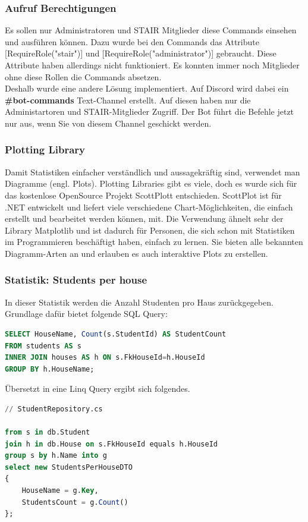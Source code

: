 \documentclass[a4paper, table]{article}
\begin{document}
\subsubsection*{Aufruf Berechtigungen}
Es sollen nur Administratoren und STAIR Mitglieder diese Commands einsehen und ausführen können.
Dazu wurde bei den Commands das Attribute [RequireRole("stair")] und [RequireRole("administrator")] gebraucht.
Diese Attribute haben allerdings nicht funktioniert.
Es konnten immer noch Mitglieder ohne diese Rollen die Commands absetzen.\\
Deshalb wurde eine andere Lösung implementiert.
Auf Discord wird dabei ein \textbf{\#bot-commands} Text-Channel erstellt.
Auf diesen haben nur die Administartoren und STAIR-Mitglieder Zugriff.
Der Bot führt die Befehle jetzt nur aus, wenn Sie von diesem Channel geschickt werden.

\subsubsection*{Plotting Library}
Damit Statistiken einfacher verständlich und aussagekräftig sind, verwendet man Diagramme (engl. Plots).
Plotting Libraries gibt es viele, doch es wurde sich für das kostenlose OpenSource Projekt ScottPlott entschieden.
ScottPlot ist für .NET entwickelt und liefert viele verschiedene Chart-Möglichkeiten, die einfach erstellt und bearbeitet werden können, mit.
Die Verwendung ähnelt sehr der Library Matplotlib und ist dadurch für Personen, die sich schon mit Statistiken im Programmieren beschäftigt haben, einfach zu lernen.
Sie bieten alle bekannten Diagramm-Arten an und erlauben es auch interaktive Plots zu erstellen. \autocite{noauthor_scottplot_nodate}

\newpage
\subsubsection*{Statistik: Students per house}
In dieser Statistik werden die Anzahl Studenten pro Haus zurückgegeben.
Grundlage dafür bietet folgende SQL Query:

\begin{lstlisting}[language=SQL]
SELECT HouseName, Count(s.StudentId) AS StudentCount
FROM students AS s
INNER JOIN houses AS h ON s.FkHouseId=h.HouseId
GROUP BY h.HouseName;
\end{lstlisting}

Übersetzt in eine Linq Query ergibt sich folgendes.

\begin{lstlisting}[language=SQL]
// StudentRepository.cs

from s in db.Student
join h in db.House on s.FkHouseId equals h.HouseId
group s by h.Name into g
select new StudentsPerHouseDTO
{
    HouseName = g.Key,
    StudentsCount = g.Count()
};
\end{lstlisting}
\end{document}
